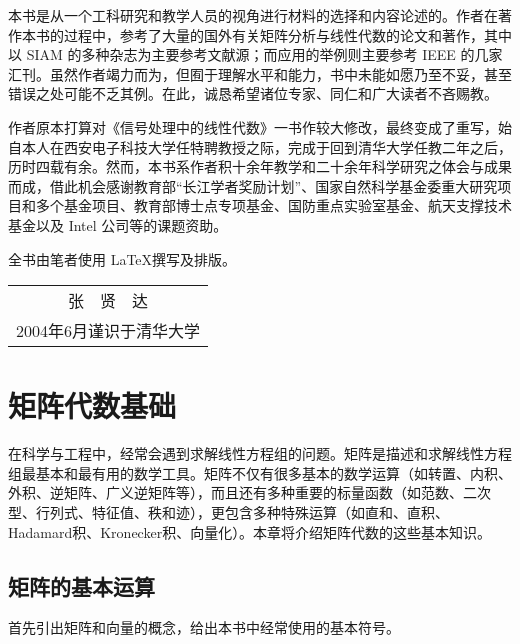\documentclass[punct=kaiming, fontset=fandol]{ctexbook}
\numberwithin{equation}{section}
\theoremstyle{mystyle}
\begin{document}
  本书是从一个工科研究和教学人员的视角进行材料的选择和内容论述的。作者在著作本书的过程中，参考了大量的国外有关矩阵分析与线性代数的论文和著作，其中以 SIAM 的多种杂志为主要参考文献源；而应用的举例则主要参考 IEEE 的几家汇刊。虽然作者竭力而为，但囿于理解水平和能力，书中未能如愿乃至不妥，甚至错误之处可能不乏其例。在此，诚恳希望诸位专家、同仁和广大读者不吝赐教。

  作者原本打算对《信号处理中的线性代数》一书作较大修改，最终变成了重写，始自本人在西安电子科技大学任特聘教授之际，完成于回到清华大学任教二年之后，历时四载有余。然而，本书系作者积十余年教学和二十余年科学研究之体会与成果而成，借此机会感谢教育部“长江学者奖励计划”、国家自然科学基金委重大研究项目和多个基金项目、教育部博士点专项基金、国防重点实验室基金、航天支撑技术基金以及 Intel 公司等的课题资助。

  全书由笔者使用 \LaTeX 撰写及排版。
  \begin{flushright}
    \fangsong
    \begin{tabular}{c@{}}
      张　贤　达\\
      {\small 2004年6月谨识于清华大学}
    \end{tabular}\hspace*{2\ccwd}
  \end{flushright}

  \tableofcontents
  \mainmatter
  \chapter{矩阵代数基础}
  在科学与工程中，经常会遇到求解线性方程组的问题。矩阵是描述和求解线性方程组最基本和最有用的数学工具。矩阵不仅有很多基本的数学运算（如转置、内积、外积、逆矩阵、广义逆矩阵等），而且还有多种重要的标量函数（如范数、二次型、行列式、特征值、秩和迹），更包含多种特殊运算（如直和、直积、Hadamard积、Kronecker积、向量化）。本章将介绍矩阵代数的这些基本知识。

  \section{矩阵的基本运算}
  首先引出矩阵和向量的概念，给出本书中经常使用的基本符号。
\end{document}
